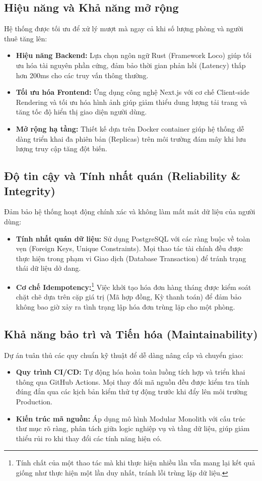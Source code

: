 \subsection{Hiệu năng và Khả năng mở rộng}
Hệ thống được tối ưu để xử lý mượt mà ngay cả khi số lượng phòng và người thuê tăng lên:
\begin{itemize}
    \item \textbf{Hiệu năng Backend:} Lựa chọn ngôn ngữ Rust (Framework Loco) giúp tối ưu hóa tài nguyên phần cứng, đảm bảo thời gian phản hồi (Latency) thấp hơn 200ms cho các truy vấn thông thường.
    \item \textbf{Tối ưu hóa Frontend:} Ứng dụng công nghệ Next.js với cơ chế Client-side Rendering và tối ưu hóa hình ảnh giúp giảm thiểu dung lượng tải trang và tăng tốc độ hiển thị giao diện người dùng.
    \item \textbf{Mở rộng hạ tầng:} Thiết kế dựa trên Docker container giúp hệ thống dễ dàng triển khai đa phiên bản (Replicas) trên môi trường đám mây khi lưu lượng truy cập tăng đột biến.
\end{itemize}

\subsection{Độ tin cậy và Tính nhất quán (Reliability \& Integrity)}
Đảm bảo hệ thống hoạt động chính xác và không làm mất mát dữ liệu của người dùng:
\begin{itemize}
    \item \textbf{Tính nhất quán dữ liệu:} Sử dụng PostgreSQL với các ràng buộc về toàn vẹn (Foreign Keys, Unique Constraints). Mọi thao tác tài chính đều được thực hiện trong phạm vi Giao dịch (Database Transaction) để tránh trạng thái dữ liệu dở dang.
    \item \textbf{Cơ chế Idempotency:}\footnote{Tính chất của một thao tác mà khi thực hiện nhiều lần vẫn mang lại kết quả giống như thực hiện một lần duy nhất, tránh lỗi trùng lặp dữ liệu.} Việc khởi tạo hóa đơn hàng tháng được kiểm soát chặt chẽ dựa trên cặp giá trị (Mã hợp đồng, Kỳ thanh toán) để đảm bảo không bao giờ xảy ra tình trạng lập hóa đơn trùng lặp cho một phòng.
\end{itemize}

\subsection{Khả năng bảo trì và Tiến hóa (Maintainability)}
Dự án tuân thủ các quy chuẩn kỹ thuật để dễ dàng nâng cấp và chuyển giao:
\begin{itemize}
    \item \textbf{Quy trình CI/CD:} Tự động hóa hoàn toàn luồng tích hợp và triển khai thông qua GitHub Actions. Mọi thay đổi mã nguồn đều được kiểm tra tính đúng đắn qua các kịch bản kiểm thử tự động trước khi đẩy lên môi trường Production.
    \item \textbf{Kiến trúc mã nguồn:} Áp dụng mô hình Modular Monolith với cấu trúc thư mục rõ ràng, phân tách giữa logic nghiệp vụ và tầng dữ liệu, giúp giảm thiểu rủi ro khi thay đổi các tính năng hiện có.
\end{itemize}

